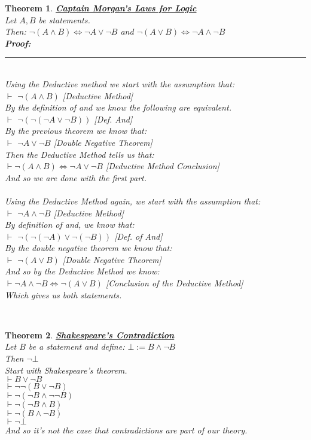\documentclass[12pt]{extarticle}
\theoremstyle{plain}
\newtheorem{thm}{Theorem}[section]
\theoremstyle{plain}
\theoremstyle{plain}
\theoremstyle{Definition}
\theoremstyle{Definition}
\theoremstyle{plain}
\theoremstyle{plain}
\newcommand{\cut}[0]{\noindent\framebox[\linewidth]{\rule{\linewidth}{2pt}}\\}
\newcommand{\prof}[0]{	\noindent \textbf{Proof:} \rule{500pt}{2pt} \\ }
\newcommand{\ddash}{\boxed{\vdash} }
\begin{document}
\begin{thm} \underline{\textbf{Captain Morgan's Laws for Logic}} \\ 
	Let $A,B$ be statements. \\ 
	Then: $\lnot(A \land B) \Leftrightarrow \lnot A \lor \lnot B$ and $\lnot(A \lor B) \Leftrightarrow \lnot A \land \lnot B$ \\
	\prof
	Using the Deductive method we start with the assumption that: \\
	$\ddash$ $\lnot(A \land B)$ \hfill [Deductive Method] \\
	By the definition of and we know the following are equivalent. \\ 
	$\ddash$ $\lnot( \lnot( \lnot A \lor \lnot B) )$ \hfill [Def. And] \\ 
	By the previous theorem we know that: \\ 
	$\ddash$ $\lnot A \lor \lnot B$ \hfill [Double Negative Theorem] \\ 
	Then the Deductive Method tells us that: \\ 
	$\vdash \lnot(A \land B) \Leftrightarrow \lnot A \lor \lnot B$ \hfill [Deductive Method Conclusion] \\
	And so we are done with the first part. \\ \\
	Using the Deductive Method again, we start with the assumption that: \\ 
	$\ddash$ $ \lnot A \land \lnot B$ \hfill [Deductive Method] \\
	By definition of and, we know that: \\ 
	$\ddash$ $\lnot (\lnot (\lnot A) \lor \lnot (\lnot B)) $ \hfill [Def. of And] \\ 
	By the double negative theorem we know that: \\ 
	$\ddash$ $\lnot (A \lor B)$ \hfill [Double Negative Theorem] \\
	And so by the Deductive Method we know: \\ 
	$\vdash \lnot A \land \lnot B \Leftrightarrow \lnot (A \lor B)$ \hfill [Conclusion of the Deductive Method] \\
	Which gives us both statements. 
\end{thm}
\cut 
\begin{thm} \underline{\textbf{Shakespeare's Contradiction}} \\
	Let $B$ be a statement and define: 
	$\bot  := B \wedge \lnot B$ \\
	Then $\lnot \bot$ \\ 
	Start with Shakespeare's theorem. \\ 
	$\vdash B \lor \lnot B$ \\ 
	$\vdash \lnot \lnot (B \lor \lnot B)$ \\ 
	$\vdash \lnot (\lnot B \land \lnot \lnot B)$ \\ 
	$\vdash \lnot (\lnot B \land B)$ \\
	$\vdash \lnot (B \wedge \lnot B)$ \\
	$\vdash \lnot \bot$ \\
	And so it's not the case that contradictions are part of our theory.  
\end{thm}
\end{document}
